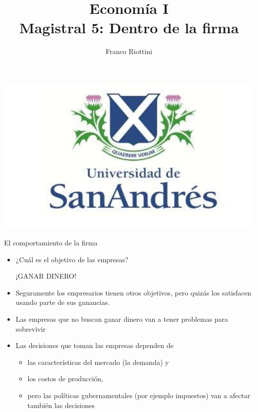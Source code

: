\documentclass{beamer}
\title[Economía I]{Economía I \vspace{4mm}
\\ Magistral 5: Dentro de la firma}
\date{}
\author[Riottini]{Franco Riottini}
\institute[]{Universidad de San Andrés}
\begin{document}
\begin{frame}
\titlepage
\centering
\includegraphics[scale=0.2]{../Figures/logoUDESA.jpg} 
\end{frame}

\begin{frame}{El comportamiento de la firma}
    \begin{itemize}
        \item ¿Cuál es el objetivo de las empresas? \vspace{2mm}
        \begin{center}
            ¡GANAR DINERO!
        \end{center}  \vspace{2mm}
         \item Seguramente los empresarios tienen otros objetivos, pero quizás los satisfacen usando parte de sus ganancias. 
         \item Las empresas que no buscan ganar dinero van a tener problemas para sobrevivir 
        \item Las decisiones que toman las empresas dependen de 
        \begin{itemize}
            \item las características del mercado (la demanda) y
            \item los costos de producción, 
            \item pero las políticas gubernamentales (por ejemplo impuestos) van a afectar también las decisiones
        \end{itemize}    
    \end{itemize}    
    \end{frame}
\end{document}
